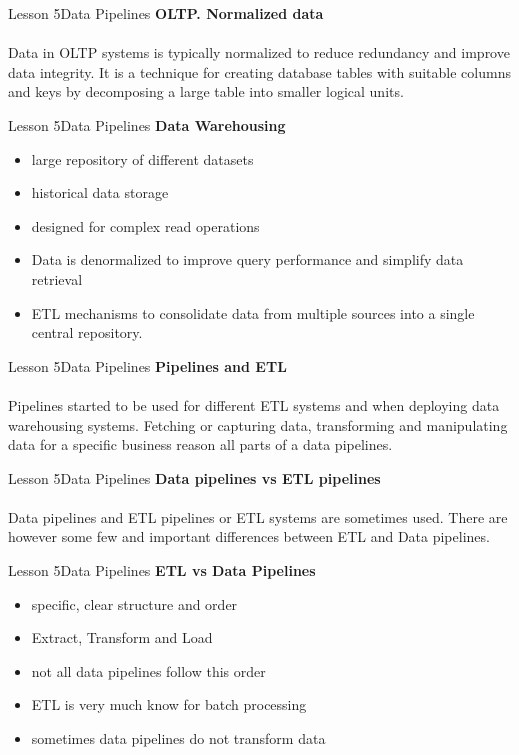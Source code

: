 \documentclass[aspectratio=1610]{beamer}
\begin{document}
\begin{frame}{Lesson 5}{Data Pipelines}
\LARGE
\textbf{OLTP. Normalized data}\\~\\
Data in OLTP systems is typically normalized to reduce redundancy and improve 
data integrity. It is a technique for creating database tables with suitable 
columns and keys by decomposing a large table into smaller logical units.
\end{frame}


\begin{frame}{Lesson 5}{Data Pipelines}
\LARGE
\textbf{Data Warehousing}\\
\begin{itemize}
	\item large repository of different datasets
	\item historical data storage
	\item designed for complex read operations
	\item Data is denormalized to improve query performance and simplify data retrieval
	\item ETL mechanisms to consolidate data from multiple sources into a single central repository.
\end{itemize}
\end{frame}



\begin{frame}{Lesson 5}{Data Pipelines}
\LARGE
\textbf{Pipelines and ETL}\\~\\
Pipelines started to be used for different ETL systems and when deploying data 
warehousing systems. Fetching or capturing data, transforming and manipulating
data for a specific business reason all parts of a data pipelines.
\end{frame}


\begin{frame}{Lesson 5}{Data Pipelines}
\LARGE
\textbf{Data pipelines vs ETL pipelines}\\~\\
Data pipelines and ETL pipelines or ETL systems are sometimes used. There are
however some few and important differences between ETL and Data pipelines. 
\end{frame}


\begin{frame}{Lesson 5}{Data Pipelines}
\LARGE
\textbf{ETL vs Data Pipelines}\\
\begin{itemize}
	\item specific, clear structure and order
	\item Extract, Transform and Load
	\item not all data pipelines follow this order
	\item ETL is very much know for batch processing
	\item sometimes data pipelines do not transform data
\end{itemize}
\end{frame}
\end{document}
